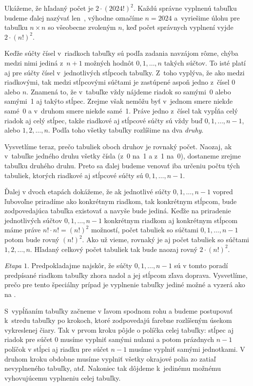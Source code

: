 {%
Ukážeme, že hľadaný počet je $2\cdot (2024!)^2$.
Každú správne vyplnenú tabuľku budeme ďalej nazývať
len~, výhodne označíme $n=2024$ a~vyriešime úlohu
pre tabuľku $n\times n$ so všeobecne zvoleným $n$,
keď počet správnych vyplnení vyjde $2\cdot(n!)^2$.

Keďže súčty čísel v~riadkoch tabuľky sú podľa
zadania navzájom rôzne, chýba medzi nimi jediná z~$n+1$
možných hodnôt $0,1,\dots,n$ takých súčtov. To isté platí
aj pre súčty čísel v~jednotlivých stĺpcoch tabuľky. Z~toho
vyplýva, že ako medzi riadkovými, tak medzi stĺpcovými súčtami
je zastúpené aspoň jedno z~čísel $0$ alebo $n$. Znamená to,
že v~tabuľke vždy nájdeme riadok so samými~0 alebo samými~1 aj takýto stĺpec.
Zrejme však nemôžu byť v~jednom smere niekde samé~0 a v~druhom smere niekde samé~1. Práve jedno z~čísel tak vypĺňa
celý riadok aj celý stĺpec, takže riadkové aj stĺpcové súčty
sú vždy buď $0,1,\dots,n-1$, alebo $1,2,\dots,n$.
Podľa toho všetky tabuľky rozlíšime na dva {\it druhy}.

Vysvetlíme teraz, prečo tabuliek oboch druhov je rovnaký počet.
Naozaj, ak v~tabuľke jedného druhu všetky čísla
 (z~0 na~1 a z~1 na~0), dostaneme zrejme
tabuľku druhého druhu. Preto sa ďalej
budeme venovať iba určeniu počtu tých tabuliek, ktorých
riadkové aj stĺpcové súčty sú $0,1,\dots,n-1$.

Ďalej v dvoch etapách dokážeme, že ak jednotlivé súčty $0,1,\dots,n-1$
vopred ľubovoľne priradíme ako konkrétnym riadkom, tak konkrétnym stĺpcom,
bude zodpovedajúca tabuľka existovať a navyše bude jediná.
Keďže na priradenie jednotlivých súčtov $0,1,\dots,n-1$
konkrétnym riadkom aj konkrétnym stĺpcom máme práve $n!\cdot
n!=(n!)^2$ možností, počet tabuliek so súčtami
$0,1,\dots,n-1$ potom bude rovný $(n!)^2$. Ako už vieme,
rovnaký je aj počet tabuliek so súčtami $1,2,\dots,n$.
Hľadaný celkový počet tabuliek tak bude naozaj
rovný $2\cdot(n!)^2$.

\emph{Etapa $1$}. Predpokladajme najskôr, že súčty $0,1,\dots,n-1$ sú
v tomto poradí predpísané riadkom tabuľky zhora nadol a jej
stĺpcom zľava doprava.
Vysvetlíme, prečo pre tento špeciálny prípad je
vyplnenie tabuľky jediné možné
a vyzerá ako na \obr{}.
%

S~vypĺňaním tabuľky začneme v ľavom spodnom
rohu a budeme postupovať k~stredu tabuľky 
po krokoch, ktoré zodpovedajú farebne rozlíšeným úsekom
vykreslenej čiary. Tak v prvom kroku
pôjde o  políčka celej tabuľky: stĺpec aj riadok pre
súčet 0 musíme vyplniť samými nulami a potom prázdnych $n-1$
políčok v stĺpci aj riadku pre súčet $n-1$ musíme vyplniť samými
jednotkami. V druhom kroku obdobne musíme vyplniť všetky
okrajové polia zo zatiaľ nevyplneného  tabuľky, atď.
Nakoniec tak dôjdeme k~jedinému možnému vyhovujúcemu vyplneniu
celej tabuľky.

}
